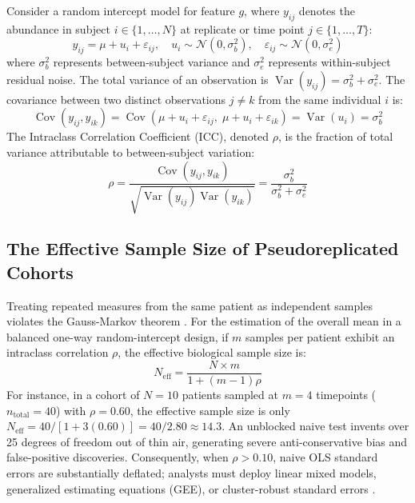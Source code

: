 \documentclass[11pt,twoside,openright]{book}
\begin{document}
Consider a random intercept model for feature $g$, where $y_{ij}$ denotes the abundance in subject $i \in \{1, \dots, N\}$ at replicate or time point $j \in \{1, \dots, T\}$:
\begin{equation}
\label{eq:random_intercept}
y_{ij} = \mu + u_i + \varepsilon_{ij}, \quad u_i \sim \mathcal{N}(0, \sigma_b^2), \quad \varepsilon_{ij} \sim \mathcal{N}(0, \sigma_e^2)
\end{equation}
where $\sigma_b^2$ represents between-subject variance and $\sigma_e^2$ represents within-subject residual noise. The total variance of an observation is $\operatorname{Var}(y_{ij}) = \sigma_b^2 + \sigma_e^2$. The covariance between two distinct observations $j \neq k$ from the same individual $i$ is:
\begin{equation}
\operatorname{Cov}(y_{ij}, y_{ik}) = \operatorname{Cov}(\mu + u_i + \varepsilon_{ij}, \; \mu + u_i + \varepsilon_{ik}) = \operatorname{Var}(u_i) = \sigma_b^2
\end{equation}
The Intraclass Correlation Coefficient (ICC), denoted $\rho$, is the fraction of total variance attributable to between-subject variation:
\begin{equation}
\label{eq:icc_formula}
\rho = \frac{\operatorname{Cov}(y_{ij}, y_{ik})}{\sqrt{\operatorname{Var}(y_{ij})\operatorname{Var}(y_{ik})}} = \frac{\sigma_b^2}{\sigma_b^2 + \sigma_e^2}
\end{equation}

\subsection{The Effective Sample Size of Pseudoreplicated Cohorts}

Treating repeated measures from the same patient as independent samples violates the Gauss-Markov theorem \cite{hurlbert1984pseudoreplication}. For the estimation of the overall mean in a balanced one-way random-intercept design, if $m$ samples per patient exhibit an intraclass correlation $\rho$, the effective biological sample size is:
\begin{equation}
\label{eq:neff}
N_{\text{eff}} = \frac{N \times m}{1 + (m - 1)\rho}
\end{equation}
For instance, in a cohort of $N = 10$ patients sampled at $m = 4$ timepoints ($n_{\text{total}} = 40$) with $\rho = 0.60$, the effective sample size is only $N_{\text{eff}} = 40 / [1 + 3(0.60)] = 40 / 2.80 \approx 14.3$. An unblocked naive test invents over 25 degrees of freedom out of thin air, generating severe anti-conservative bias and false-positive discoveries. Consequently, when $\rho > 0.10$, naive OLS standard errors are substantially deflated; analysts must deploy linear mixed models, generalized estimating equations (GEE), or cluster-robust standard errors \cite{hurlbert1984pseudoreplication, diggle2002analysis}.
\end{document}
